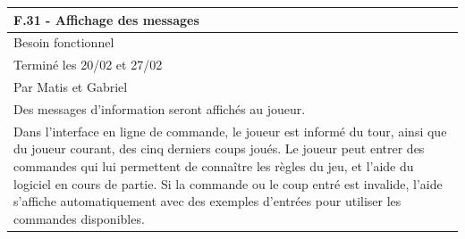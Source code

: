 \documentclass[a4paper,12pt]{article}
\begin{document}
\vspace{1cm}

\noindent
\setlength{\arrayrulewidth}{1.5pt}
\renewcommand{\arraystretch}{1.5}
\begin{tabularx}{\textwidth}{|X|}
    \hline
    \textbf{F.31 - Affichage des messages}                                                                                                                                                                                                                                                                                                                                                                                 \\
    \hline
    Besoin fonctionnel                                                                                                                                                                                                                                                                                                                                                                                                     \\
    \hline
    Terminé les 20/02 et 27/02                                                                                                                                                                                                                                                                                                                                                                                             \\
    Par Matis et Gabriel                                                                                                                                                                                                                                                                                                                                                                                                   \\
    \hline
    Des messages d’information seront affichés au joueur.                                                                                                                                                                                                                                                                                                                                                                  \\
    Dans l’interface en ligne de commande, le joueur est informé du tour, ainsi que du joueur courant, des cinq derniers coups joués. Le joueur peut entrer des commandes qui lui permettent de connaître les règles du jeu, et l’aide du logiciel en cours de partie. Si la commande ou le coup entré est invalide, l’aide s’affiche automatiquement avec des exemples d’entrées pour utiliser les commandes disponibles. \\

\end{tabularx}
\end{document}
